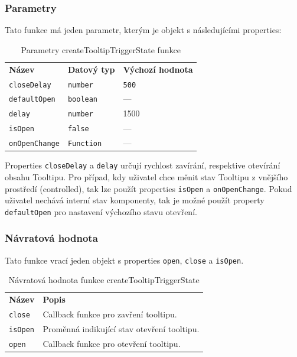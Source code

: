 \subsubsection{Parametry}

Tato funkce má jeden parametr, kterým je objekt s následujícími properties:

\begin{table}[ht]\label{table:tooltip-trigger-state-params}
    \begin{ctucolortab}
        \begin{tabularx}{\textwidth}{X X X}
            \bfseries Název       & \bfseries Datový typ & \bfseries Výchozí hodnota \\\Midrule{}
            \texttt{closeDelay}   & \texttt{number}      & \texttt{500}              \\
            \texttt{defaultOpen}  & \texttt{boolean}     & ---                       \\
            \texttt{delay}        & \texttt{number}      & 1500                      \\
            \texttt{isOpen}       & \texttt{false}       & ---                       \\
            \texttt{onOpenChange} & \texttt{Function}    & ---
        \end{tabularx}
    \end{ctucolortab}
    \caption{Parametry createTooltipTriggerState funkce}
\end{table}

Properties \texttt{closeDelay} a \texttt{delay} určují rychlost zavírání, respektive otevírání obsahu Tooltipu.
Pro případ, kdy uživatel chce měnit stav Tooltipu z vnějšího prostředí (controlled), tak lze použít properties \texttt{isOpen} a \texttt{onOpenChange}.
Pokud uživatel nechává interní stav komponenty, tak je možné použít property \texttt{defaultOpen} pro nastavení výchozího stavu otevření.

\subsubsection{Návratová hodnota}

Tato funkce vrací jeden objekt s properties \texttt{open}, \texttt{close} a \texttt{isOpen}.

\begin{table}[ht]\label{table:tooltip-trigger-state-return}
    \begin{ctucolortab}
        \begin{tabularx}{\textwidth}{p{3cm} X}
            \bfseries Název & \bfseries Popis                             \\\Midrule{}
            \texttt{close}  & Callback funkce pro zavření tooltipu.       \\
            \texttt{isOpen} & Proměnná indikující stav otevření tooltipu. \\
            \texttt{open}   & Callback funkce pro otevření tooltipu.
        \end{tabularx}
    \end{ctucolortab}
    \caption{Návratová hodnota funkce createTooltipTriggerState}
\end{table}

